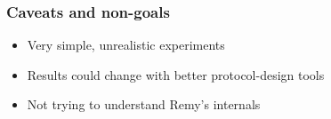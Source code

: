\begin{frame}
\frametitle{Caveats and non-goals}
\begin{itemize}
\item Very simple, unrealistic experiments
\item Results could change with better protocol-design tools
\item Not trying to understand Remy's internals
\end{itemize}
\end{frame}
